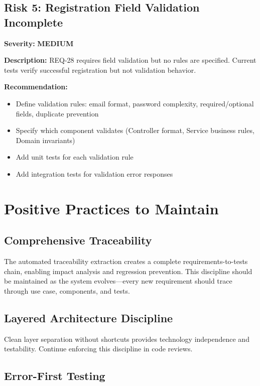 \documentclass[11pt,a4paper]{article}
\begin{document}
\subsection{Risk 5: Registration Field Validation Incomplete}

\textbf{Severity:} \textbf{MEDIUM}

\textbf{Description:} REQ-28 requires field validation but no rules are specified. Current tests verify successful registration but not validation behavior.

\textbf{Recommendation:}
\begin{itemize}
    \item Define validation rules: email format, password complexity, required/optional fields, duplicate prevention
    \item Specify which component validates (Controller format, Service business rules, Domain invariants)
    \item Add unit tests for each validation rule
    \item Add integration tests for validation error responses
\end{itemize}

\section{Positive Practices to Maintain}

\subsection{Comprehensive Traceability}

The automated traceability extraction creates a complete requirements-to-tests chain, enabling impact analysis and regression prevention. This discipline should be maintained as the system evolves—every new requirement should trace through use case, components, and tests.

\subsection{Layered Architecture Discipline}

Clean layer separation without shortcuts provides technology independence and testability. Continue enforcing this discipline in code reviews.

\subsection{Error-First Testing}
\end{document}
